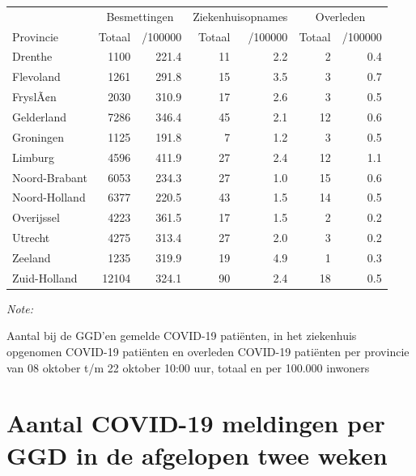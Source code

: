\documentclass[
  english,
  man,floatsintext]{apa6}
\begin{document}
\begin{table}
\centering
\begin{threeparttable}
\begin{tabular}{lrrrrrr}
\toprule
\multicolumn{1}{c}{ } & \multicolumn{2}{c}{Besmettingen} & \multicolumn{2}{c}{Ziekenhuisopnames} & \multicolumn{2}{c}{Overleden} \\
\cmidrule(l{3pt}r{3pt}){2-3} \cmidrule(l{3pt}r{3pt}){4-5} \cmidrule(l{3pt}r{3pt}){6-7}
Provincie & Totaal & /100000 & Totaal & /100000 & Totaal & /100000\\
\midrule
Drenthe & 1100 & 221.4 & 11 & 2.2 & 2 & 0.4\\
Flevoland & 1261 & 291.8 & 15 & 3.5 & 3 & 0.7\\
FryslÃ¢n & 2030 & 310.9 & 17 & 2.6 & 3 & 0.5\\
Gelderland & 7286 & 346.4 & 45 & 2.1 & 12 & 0.6\\
Groningen & 1125 & 191.8 & 7 & 1.2 & 3 & 0.5\\
Limburg & 4596 & 411.9 & 27 & 2.4 & 12 & 1.1\\
Noord-Brabant & 6053 & 234.3 & 27 & 1.0 & 15 & 0.6\\
Noord-Holland & 6377 & 220.5 & 43 & 1.5 & 14 & 0.5\\
Overijssel & 4223 & 361.5 & 17 & 1.5 & 2 & 0.2\\
Utrecht & 4275 & 313.4 & 27 & 2.0 & 3 & 0.2\\
Zeeland & 1235 & 319.9 & 19 & 4.9 & 1 & 0.3\\
Zuid-Holland & 12104 & 324.1 & 90 & 2.4 & 18 & 0.5\\
\bottomrule
\end{tabular}
\begin{tablenotes}
\item \textit{Note: } 
\item Aantal bij de GGD’en gemelde COVID-19 patiënten, in het ziekenhuis opgenomen COVID-19 patiënten en overleden COVID-19 patiënten per provincie van 08 oktober t/m 22 oktober 10:00 uur, totaal en per 100.000 inwoners
\end{tablenotes}
\end{threeparttable}
\end{table}

\newpage

\hypertarget{aantal-covid-19-meldingen-per-ggd-in-de-afgelopen-twee-weken}{%
\section{Aantal COVID-19 meldingen per GGD in de afgelopen twee weken}\label{aantal-covid-19-meldingen-per-ggd-in-de-afgelopen-twee-weken}}
\end{document}
